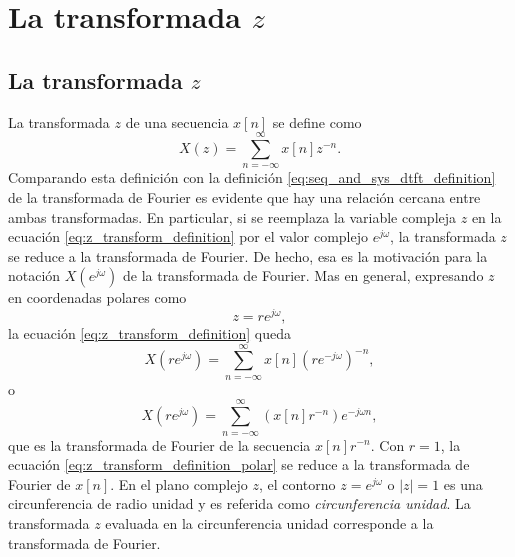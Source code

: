 \documentclass[a4paper]{report}
\begin{document}
\chapter{La transformada \texorpdfstring{\(z\)}{z}}\label{ch:z_transform}

\section{La transformada \texorpdfstring{\(z\)}{z}}

La transformada \(z\) de una secuencia \(x[n]\) se define como
\begin{equation}\label{eq:z_transform_definition}
 X(z)=\sum_{n=-\infty}^\infty x[n]z^{-n}. 
\end{equation}
Comparando esta definición con la definición \ref{eq:seq_and_sys_dtft_definition} de la transformada de Fourier es evidente que hay una relación cercana entre ambas transformadas. En particular, si se reemplaza la variable compleja \(z\) en la ecuación \ref{eq:z_transform_definition} por el valor complejo \(e^{j\omega}\), la transformada \(z\) se reduce a la transformada de Fourier. De hecho, esa es la motivación para la notación \(X(e^{j\omega})\) de la transformada de Fourier. Mas en general, expresando \(z\) en coordenadas polares como
\[
 z=re^{j\omega},
\]
la ecuación \ref{eq:z_transform_definition} queda
\[
 X(re^{j\omega})=\sum_{n=-\infty}^\infty x[n](re^{-j\omega})^{-n},
\]
o
\begin{equation}\label{eq:z_transform_definition_polar}
 X(re^{j\omega})=\sum_{n=-\infty}^\infty(x[n]r^{-n})e^{-j\omega n}, 
\end{equation}
que es la transformada de Fourier de la secuencia \(x[n]r^{-n}\). Con \(r=1\), la ecuación \ref{eq:z_transform_definition_polar} se reduce a la transformada de Fourier de \(x[n]\). En el plano complejo \(z\), el contorno \(z=e^{j\omega}\) o \(|z|=1\) es una circunferencia de radio unidad y es referida como \emph{circunferencia unidad}. La transformada \(z\) evaluada en la circunferencia unidad corresponde a la transformada de Fourier.
\end{document}
